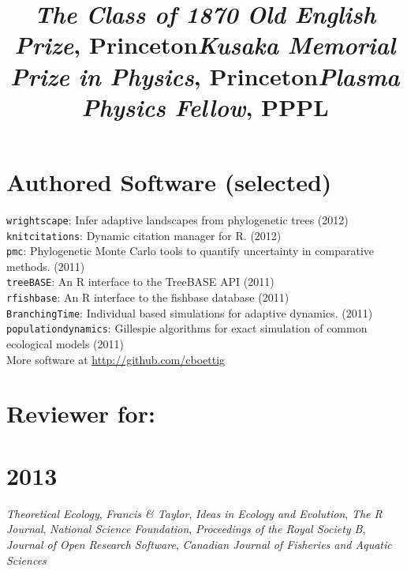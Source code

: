 \documentclass[margin]{res}
\begin{document}
\begin{resume}
\title{\emph{The Class of 1870 Old English Prize},  Princeton}
\begin{position}   \vspace{-.8cm} \end{position}

\title{\emph{Kusaka Memorial Prize in Physics}, Princeton}
\begin{position}   \vspace{-.8cm} \end{position}

\title{\emph{Plasma Physics Fellow},  PPPL }
\begin{position}   \vspace{-.8cm} \end{position}



  
  \section{Authored Software (selected)} 
{ \footnotesize
\texttt{wrightscape}: Infer adaptive landscapes from phylogenetic trees (2012) \\
\texttt{knitcitations}: Dynamic citation manager for R. (2012) \\
\texttt{pmc}: Phylogenetic Monte Carlo tools to quantify uncertainty in comparative methods. (2011)\\
\texttt{treeBASE}: An R interface to the TreeBASE API (2011) \\
\texttt{rfishbase}: An R interface to the fishbase database (2011) \\
\texttt{BranchingTime}: Individual based simulations for adaptive dynamics. (2011) \\
\texttt{populationdynamics}: Gillespie algorithms for exact simulation of common ecological models (2011) \\ 
More software at \href{http://github.com/cboettig}{http://github.com/cboettig}
}

\section{Reviewer for:}
\section{\textnormal{2013}}
\emph{Theoretical Ecology}, \emph{Francis \& Taylor}, \emph{Ideas in Ecology and Evolution}, \emph{The R Journal}, \emph{National Science Foundation}, \emph{Proceedings of the Royal Society B}, \emph{Journal of Open Research Software}, \emph{Canadian Journal of Fisheries and Aquatic Sciences} 


\end{resume}
\end{document}
